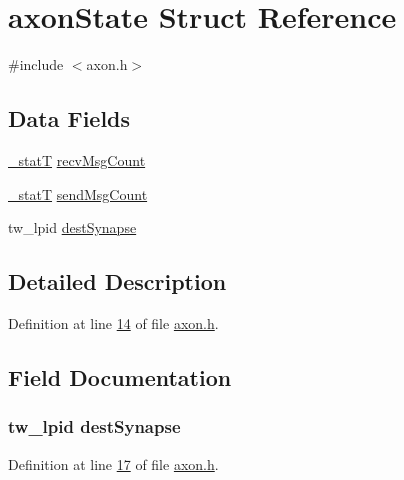 \hypertarget{structaxon_state}{}\section{axon\+State Struct Reference}
\label{structaxon_state}


{\ttfamily \#include $<$axon.\+h$>$}

\subsection*{Data Fields}
\begin{DoxyCompactItemize}
\item 
\hyperlink{assist_8h_ad77e6fc5a9b03d46e7c97b7c4b92e89f}{\+\_\+stat\+T} \hyperlink{structaxon_state_a7fc444364b1559859bccdf91f1e95475}{recv\+Msg\+Count}
\item 
\hyperlink{assist_8h_ad77e6fc5a9b03d46e7c97b7c4b92e89f}{\+\_\+stat\+T} \hyperlink{structaxon_state_a217ba44fb923dc4dc62bb73b14e61517}{send\+Msg\+Count}
\item 
tw\+\_\+lpid \hyperlink{structaxon_state_a665999819b255f36d756f17b85bc9a03}{dest\+Synapse}
\end{DoxyCompactItemize}


\subsection{Detailed Description}


Definition at line \hyperlink{axon_8h_source_l00014}{14} of file \hyperlink{axon_8h_source}{axon.\+h}.



\subsection{Field Documentation}
\hypertarget{structaxon_state_a665999819b255f36d756f17b85bc9a03}{}
\subsubsection[{dest\+Synapse}]{\setlength{\rightskip}{0pt plus 5cm}tw\+\_\+lpid dest\+Synapse}\label{structaxon_state_a665999819b255f36d756f17b85bc9a03}


Definition at line \hyperlink{axon_8h_source_l00017}{17} of file \hyperlink{axon_8h_source}{axon.\+h}.

